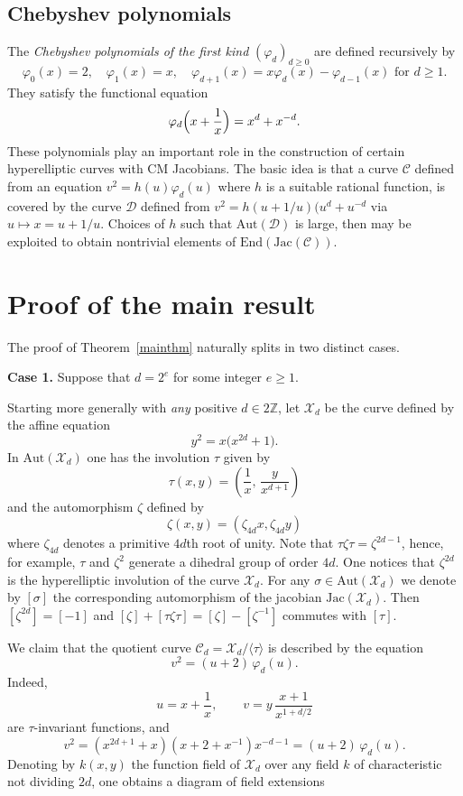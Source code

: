 \documentclass[a4paper,12pt]{amsart}
\def\cC{{\mathcal C}}
\def\cX{{\mathcal X}}
\def\cD{{\mathcal D}}
\numberwithin{equation}{section}
\theoremstyle{plain}
\numberwithin{thm}{section}
\begin{document}
\subsection{Chebyshev polynomials}
The \emph{Chebyshev polynomials of the first kind} $(\varphi_d)_{d\ge 0}$ are defined recursively by
\[
\varphi_0(x) = 2, \quad \varphi_1(x) = x, \quad \varphi_{d+1}(x) = x \varphi_d(x) - \varphi_{d-1}(x) \text{ for } d\ge 1.
\]
They satisfy the functional equation
\[
\varphi_d\Bigl(x + \frac{1}{x}\Bigr) = x^d + x^{-d}.
\]
These polynomials play an important role in the construction of certain hyperelliptic curves with CM Jacobians.
The basic idea is that a curve $\cC$ defined from an
equation $v^2=h(u)\varphi_d(u)$ where $h$ is a suitable
rational function, is covered by the curve $\cD$ defined from
$v^2=h(u+1/u)(u^d+u^{-d}$ via $u\mapsto x=u+1/u$.
Choices of $h$ such that $\textrm{Aut}(\cD)$ is large, then
may be exploited to obtain nontrivial elements of
$\textrm{End}(\textrm{Jac}(\cC))$.


\section{Proof of the main result}

The proof of Theorem~\ref{mainthm}
naturally splits in two distinct cases. 

\medskip
\noindent
\textbf{Case 1.} Suppose that $d=2^{e}$ for some integer $e\geq 1$.  

Starting more generally with {\em any}
positive $d\in 2\mathbb{Z}$, let $\cX_d$ be the curve defined by the affine equation
\[
y^{2} = x\bigl(x^{2d} + 1\bigr).
\]
In $\text{Aut}(\cX_d)$ one has the involution $\tau$ given by
\[
\tau(x,y) = \left( \frac{1}{x}, \, \frac{y}{x^{d+1}} \right)
\]
and the automorphism $\zeta$ defined by
\[ \zeta(x,y) = (\zeta_{4d}x,\zeta_{4d}y)\]
where $\zeta_{4d}$ denotes a primitive $4d$th root of unity.
Note that $\tau\zeta\tau=\zeta^{2d-1}$,
hence, for example, $\tau$ and $\zeta^2$ generate a dihedral group of
order $4d$. One notices that
$\zeta^{2d}$ is the hyperelliptic involution of the curve $\cX_d$.
For any $\sigma\in\textrm{Aut}(\cX_d)$
we denote by $[\sigma]$ the corresponding automorphism of the
jacobian $\textrm{Jac}(\cX_d)$.
Then $[\zeta^{2d}]=[-1]$
and $[\zeta]+[\tau\zeta\tau]=[\zeta]-[\zeta^{-1}]$ commutes with $[\tau]$.



We claim that the quotient curve $\cC_d = \cX_d / \langle \tau \rangle$ is described by the equation
\[
v^{2} = (u + 2)\,\varphi_{d}(u).
\]
Indeed, 
\[
u = x + \frac{1}{x}, 
\qquad 
v = y\,\frac{x + 1}{x^{1 + d/2}}
\]
are $\tau$-invariant functions, and
\[
v^{2} = (x^{2d+1}+x)(x+2+x^{-1})x^{-d-1}=(u + 2)\,\varphi_{d}(u).
\]
Denoting by $k(x,y)$ the function field of $\cX_d$ over any field $k$
of characteristic not dividing $2d$, 
one obtains a diagram of field extensions
\end{document}
